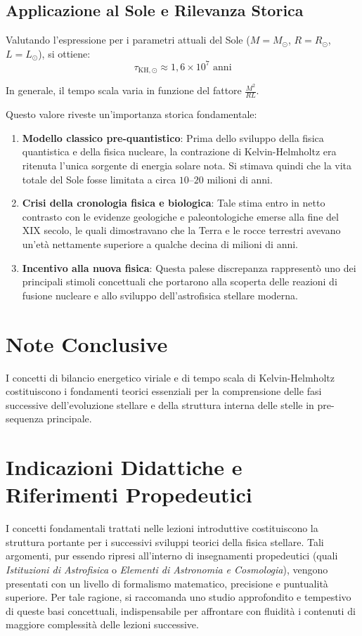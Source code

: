 \subsection{Applicazione al Sole e Rilevanza Storica}
Valutando l'espressione per i parametri attuali del Sole ($M = M_\odot$, $R = R_\odot$, $L = L_\odot$), si ottiene:
\begin{equation}
\tau_{\text{KH}, \odot} \approx 1{,}6 \times 10^7 \text{ anni}
\end{equation}

In generale, il tempo scala varia in funzione del fattore $\frac{M^2}{R L}$.

Questo valore riveste un'importanza storica fondamentale:
\begin{enumerate}
\item \textbf{Modello classico pre-quantistico}: Prima dello sviluppo della fisica quantistica e della fisica nucleare, la contrazione di Kelvin-Helmholtz era ritenuta l'unica sorgente di energia solare nota. Si stimava quindi che la vita totale del Sole fosse limitata a circa $10\text{--}20$ milioni di anni.
\item \textbf{Crisi della cronologia fisica e biologica}: Tale stima entro in netto contrasto con le evidenze geologiche e paleontologiche emerse alla fine del XIX secolo, le quali dimostravano che la Terra e le rocce terrestri avevano un'età nettamente superiore a qualche decina di milioni di anni.
\item \textbf{Incentivo alla nuova fisica}: Questa palese discrepanza rappresentò uno dei principali stimoli concettuali che portarono alla scoperta delle reazioni di fusione nucleare e allo sviluppo dell'astrofisica stellare moderna.
\end{enumerate}

\section{Note Conclusive}
I concetti di bilancio energetico viriale e di tempo scala di Kelvin-Helmholtz costituiscono i fondamenti teorici essenziali per la comprensione delle fasi successive dell'evoluzione stellare e della struttura interna delle stelle in pre-sequenza principale.

\section{Indicazioni Didattiche e Riferimenti Propedeutici}

I concetti fondamentali trattati nelle lezioni introduttive costituiscono la struttura portante per i successivi sviluppi teorici della fisica stellare. Tali argomenti, pur essendo ripresi all'interno di insegnamenti propedeutici (quali \textit{Istituzioni di Astrofisica} o \textit{Elementi di Astronomia e Cosmologia}), vengono presentati con un livello di formalismo matematico, precisione e puntualità superiore. Per tale ragione, si raccomanda uno studio approfondito e tempestivo di queste basi concettuali, indispensabile per affrontare con fluidità i contenuti di maggiore complessità delle lezioni successive.

